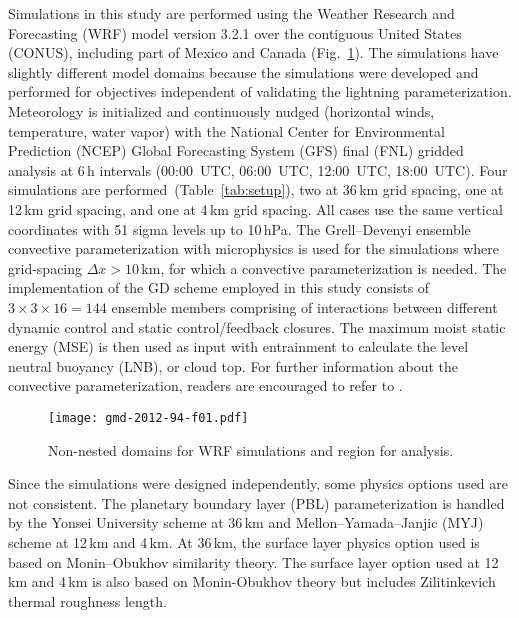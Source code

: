 Simulations in this study are performed using the Weather Research and
Forecasting (WRF) model version 3.2.1 \citep{Skamarock:2008xx} over the
contiguous United States (CONUS), including part of Mexico and Canada
(Fig.~\ref{fig:domain}). The simulations have slightly different model
domains because the simulations were developed and performed for objectives
independent of validating the lightning parameterization. Meteorology is
initialized and continuously nudged (horizontal winds, temperature, water
vapor) with the National Center for Environmental Prediction (NCEP) Global
Forecasting System (GFS) final (FNL) gridded analysis at 6\,h intervals
(00:00~UTC, 06:00~UTC, 12:00~UTC, 18:00~UTC). Four simulations are performed~(Table~\ref{tab:setup}),
two at 36\,\unit{km} grid spacing, one at 12\,\unit{km} grid spacing, and one
at 4\,\unit{km} grid spacing. All cases use the same vertical coordinates
with 51 sigma levels up to 10\,\unit{hPa}. The Grell--Devenyi ensemble
convective parameterization \citep{Grell:2002bs} with \citet{Thompson:2008vn}
microphysics is used for the simulations where grid-spacing $\Delta x >
10$\,km, for which a convective parameterization is needed. The
implementation of the GD scheme employed in this study consists of $3 \times
3 \times 16=144$ ensemble members comprising of interactions between
different dynamic control and static control/feedback closures. The maximum
moist static energy (MSE) is then used as input with entrainment to calculate
the level neutral buoyancy (LNB), or cloud top. For further information about
the convective parameterization, readers are encouraged to refer to
\citet{Grell:1993dz}.





\begin{figure}[t]
      \texttt{[image: gmd-2012-94-f01.pdf]}
      \caption{Non-nested domains for WRF simulations and region for analysis.}
      \label{fig:domain}
\end{figure}

Since the simulations were designed independently, some physics options used
are not consistent. The planetary \mbox{boundary} layer (PBL) parameterization is
handled by the Yonsei University scheme \citep{Hong:2006fk} at 36\,\unit{km}
and Mellon--Yamada--Janjic (MYJ) scheme \citep{Janjic:1994fk} at 12\,\unit{km}
and 4\,\unit{km}. At 36\,\unit{km}, the surface layer physics option used is
based on Monin--Obukhov similarity theory. The surface layer option used at
12\,\unit{km} and 4\,\unit{km} is also based on Monin-Obukhov theory but
includes Zilitinkevich thermal roughness length.

